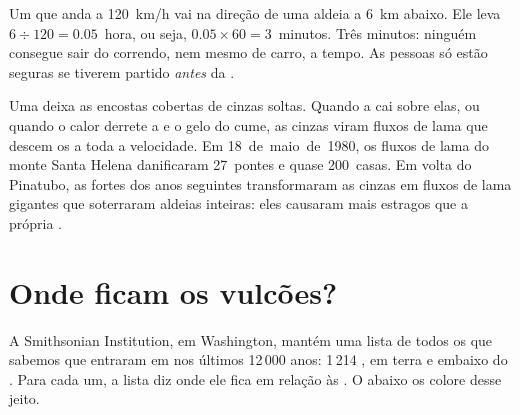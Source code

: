 \begin{example}\label{ex:g7:volcanoes:race}
Um  que anda a \qty{120}{km/h} vai na direção de uma
aldeia a \qty{6}{km}  abaixo. Ele leva $6 \div 120 = 0.05$~hora, ou
seja, $0.05 \times 60 = 3$~minutos. Três minutos: ninguém consegue sair do
 correndo, nem mesmo de carro, a tempo. As pessoas só estão seguras se
tiverem partido \emph{antes} da .
\end{example}

\begin{remark}\label{rem:g7:volcanoes:mudflows}
Uma  deixa as encostas cobertas de cinzas soltas. Quando a  cai
sobre elas, ou quando o calor derrete a  e o gelo do cume, as cinzas
viram fluxos de lama que descem os  a toda a velocidade. Em
18~de~maio~de~1980, os fluxos de lama do monte Santa Helena danificaram
27~pontes e quase 200~casas. Em volta do Pinatubo, as  fortes dos
anos seguintes transformaram as cinzas em fluxos de lama gigantes que
soterraram aldeias inteiras: eles causaram mais estragos que a própria
.
\end{remark}


\section{Onde ficam os vulcões?}

A Smithsonian Institution, em Washington, mantém uma lista de todos os
 que sabemos que entraram em  nos últimos 12\,000 anos:
1\,214 , em terra e embaixo do . Para cada um, a lista diz onde
ele fica em relação às . O  abaixo os colore desse jeito.

